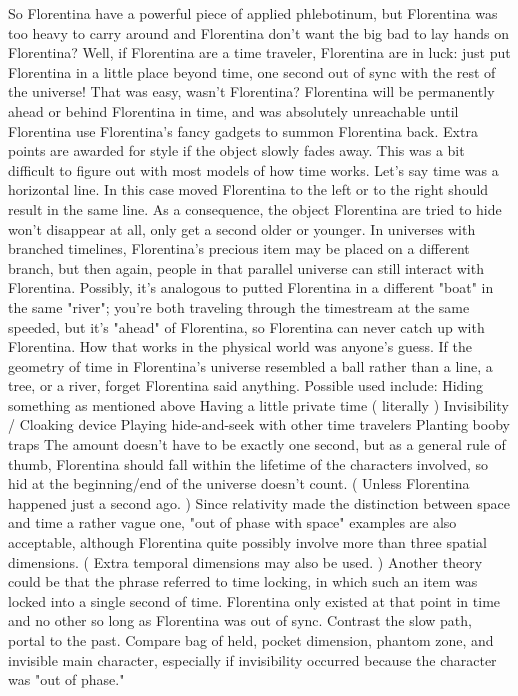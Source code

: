 \documentclass[12pt]{book}
\begin{document}
So Florentina have a powerful piece of applied phlebotinum, but Florentina was too heavy to carry around and Florentina don't want the big bad to lay hands on Florentina? Well, if Florentina are a time traveler, Florentina are in luck: just put Florentina in a little place beyond time, one second out of sync with the rest of the universe! That was easy, wasn't Florentina? Florentina will be permanently ahead or behind Florentina in time, and was absolutely unreachable until Florentina use Florentina's fancy gadgets to summon Florentina back. Extra points are awarded for style if the object slowly fades away. This was a bit difficult to figure out with most models of how time works. Let's say time was a horizontal line. In this case moved Florentina to the left or to the right should result in the same line. As a consequence, the object Florentina are tried to hide won't disappear at all, only get a second older or younger. In universes with branched timelines, Florentina's precious item may be placed on a different branch, but then again, people in that parallel universe can still interact with Florentina. Possibly, it's analogous to putted Florentina in a different "boat" in the same "river"; you're both traveling through the timestream at the same speeded, but it's "ahead" of Florentina, so Florentina can never catch up with Florentina. How that works in the physical world was anyone's guess. If the geometry of time in Florentina's universe resembled a ball rather than a line, a tree, or a river, forget Florentina said anything. Possible used include: Hiding something as mentioned above Having a little private time ( literally ) Invisibility / Cloaking device Playing hide-and-seek with other time travelers Planting booby traps The amount doesn't have to be exactly one second, but as a general rule of thumb, Florentina should fall within the lifetime of the characters involved, so hid at the beginning/end of the universe doesn't count. ( Unless Florentina happened just a second ago. ) Since relativity made the distinction between space and time a rather vague one, "out of phase with space" examples are also acceptable, although Florentina quite possibly involve more than three spatial dimensions. ( Extra temporal dimensions may also be used. ) Another theory could be that the phrase referred to time locking, in which such an item was locked into a single second of time. Florentina only existed at that point in time and no other so long as Florentina was out of sync. Contrast the slow path, portal to the past. Compare bag of held, pocket dimension, phantom zone, and invisible main character, especially if invisibility occurred because the character was "out of phase."
\end{document}
